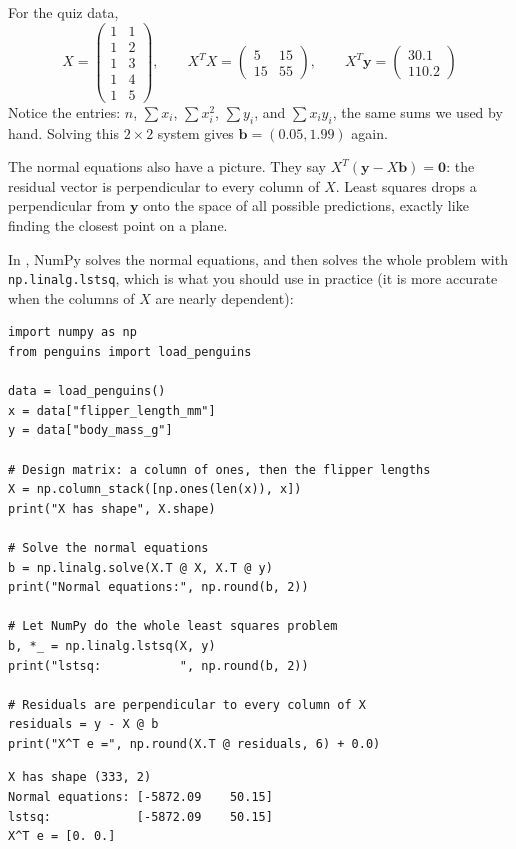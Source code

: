 For the quiz data,
$$X = \begin{pmatrix} 1 & 1 \\ 1 & 2 \\ 1 & 3 \\ 1 & 4 \\ 1 & 5 \end{pmatrix}, \qquad
X^T X = \begin{pmatrix} 5 & 15 \\ 15 & 55 \end{pmatrix}, \qquad
X^T \mathbf{y} = \begin{pmatrix} 30.1 \\ 110.2 \end{pmatrix}$$
Notice the entries: $n$, $\sum x_i$, $\sum x_i^2$, $\sum y_i$, and $\sum x_i y_i$, the same sums we used by
hand. Solving this $2 \times 2$ system gives $\mathbf{b} = (0.05, 1.99)$ again.

The normal equations also have a picture. They say $X^T(\mathbf{y} - X\mathbf{b}) = \mathbf{0}$: the residual
vector is perpendicular to every column of $X$. Least squares drops a perpendicular from $\mathbf{y}$ onto the
space of all possible predictions, exactly like finding the closest point on a plane.

In , NumPy solves the normal equations, and then solves the whole problem with
\verb|np.linalg.lstsq|, which is what you should use in practice (it is more accurate when the columns of $X$
are nearly dependent):

\begin{verbatim}
import numpy as np
from penguins import load_penguins

data = load_penguins()
x = data["flipper_length_mm"]
y = data["body_mass_g"]

# Design matrix: a column of ones, then the flipper lengths
X = np.column_stack([np.ones(len(x)), x])
print("X has shape", X.shape)

# Solve the normal equations
b = np.linalg.solve(X.T @ X, X.T @ y)
print("Normal equations:", np.round(b, 2))

# Let NumPy do the whole least squares problem
b, *_ = np.linalg.lstsq(X, y)
print("lstsq:           ", np.round(b, 2))

# Residuals are perpendicular to every column of X
residuals = y - X @ b
print("X^T e =", np.round(X.T @ residuals, 6) + 0.0)
\end{verbatim}

\begin{verbatim}
X has shape (333, 2)
Normal equations: [-5872.09    50.15]
lstsq:            [-5872.09    50.15]
X^T e = [0. 0.]
\end{verbatim}

